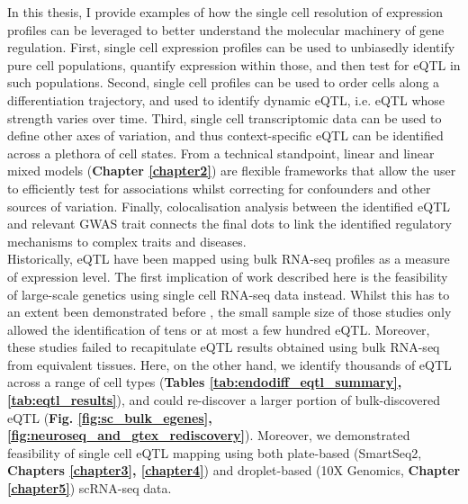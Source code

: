 In this thesis, I provide examples of how the single cell resolution of expression profiles can be leveraged to better understand the molecular machinery of gene regulation.
First, single cell expression profiles can be used to unbiasedly identify pure cell populations, quantify expression within those, and then test for eQTL in such populations.
Second, single cell profiles can be used to order cells along a differentiation trajectory, and used to identify dynamic eQTL, i.e. eQTL whose strength varies over time.
Third, single cell transcriptomic data can be used to define other axes of variation, and thus context-specific eQTL can be identified across a plethora of cell states.
From a technical standpoint, linear and linear mixed models (\textbf{Chapter 
\ref{chapter2}})
are flexible frameworks that allow the user to efficiently test for associations whilst correcting for confounders and other sources of variation.
Finally, colocalisation analysis between the identified eQTL and relevant GWAS trait connects the final dots to link the identified regulatory mechanisms to complex traits and diseases. 
\\

Historically, eQTL have been mapped using bulk RNA-seq profiles as a measure of expression level.
The first implication of work described here is the feasibility of large-scale genetics using single cell RNA-seq data instead.
Whilst this has to an extent been demonstrated before \cite{van2018single, kang2018multiplexed}, the small sample size of those studies only allowed the identification of tens or at most a few hundred eQTL.
Moreover, these studies failed to recapitulate eQTL results obtained using bulk RNA-seq from equivalent tissues.
Here, on the other hand, we identify thousands of eQTL across a range of cell types (\textbf{Tables \ref{tab:endodiff_eqtl_summary}, \ref{tab:eqtl_results}}), and could re-discover a larger portion of bulk-discovered eQTL (\textbf{Fig. \ref{fig:sc_bulk_egenes}, \ref{fig:neuroseq_and_gtex_rediscovery}}). 
Moreover, we demonstrated feasibility of single cell eQTL mapping using both plate-based (SmartSeq2, \textbf{Chapters \ref{chapter3}, \ref{chapter4}}) and droplet-based (10X Genomics, \textbf{Chapter \ref{chapter5}}) scRNA-seq data. \\

